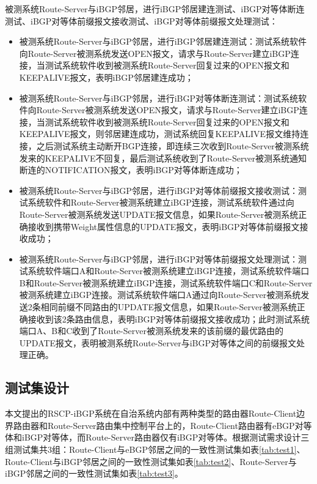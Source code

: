 被测系统Route-Server与iBGP邻居，进行iBGP邻居建连测试、iBGP对等体断连测试、iBGP对等体前缀报文接收测试、iBGP对等体前缀报文处理测试：
\begin{itemize}
  \item 被测系统Route-Server与iBGP邻居，进行iBGP邻居建连测试：测试系统软件向Route-Server被测系统发送OPEN报文，请求与Route-Server建立iBGP连接，当测试系统软件收到被测系统Route-Server回复过来的OPEN报文和KEEPALIVE报文，表明iBGP邻居建连成功；
  \item 被测系统Route-Server与iBGP邻居，进行iBGP对等体断连测试：测试系统软件向Route-Server被测系统发送OPEN报文，请求与Route-Server建立iBGP连接，当测试系统软件收到被测系统Route-Server回复过来的OPEN报文和KEEPALIVE报文，则邻居建连成功，测试系统回复KEEPALIVE报文维持连接，之后测试系统主动断开BGP连接，即连续三次收到Route-Server被测系统发来的KEEPALIVE不回复，最后测试系统收到了Route-Server被测系统通知断连的NOTIFICATION报文，表明iBGP对等体断连成功；
  \item 被测系统Route-Server与iBGP邻居，进行iBGP对等体前缀报文接收测试：测试系统软件和Route-Server被测系统建立iBGP连接，测试系统软件通过向Route-Server被测系统发送UPDATE报文信息，如果Route-Server被测系统正确接收到携带Weight属性信息的UPDATE报文，表明iBGP对等体前缀报文接收成功；
  \item 被测系统Route-Server与iBGP邻居，进行iBGP对等体前缀报文处理测试：测试系统软件端口A和Route-Server被测系统建立iBGP连接，测试系统软件端口B和Route-Server被测系统建立iBGP连接，测试系统软件端口C和Route-Server被测系统建立iBGP连接。测试系统软件端口A通过向Route-Server被测系统发送2条相同前缀不同路由的UPDATE报文信息，如果Route-Server被测系统正确接收到该2条路由信息，表明iBGP对等体前缀报文接收成功；此时测试系统端口A、B和C收到了Route-Server被测系统发来的该前缀的最优路由的UPDATE报文，表明被测系统Route-Server与iBGP对等体之间的前缀报文处理正确。
\end{itemize}



\subsection{测试集设计}

本文提出的RSCP-iBGP系统在自治系统内部有两种类型的路由器Route-Client边界路由器和Route-Server路由集中控制平台上的，Route-Client路由器有eBGP对等体和iBGP对等体，而Route-Server路由器仅有iBGP对等体。根据测试需求设计三组测试集共3组：Route-Client与eBGP邻居之间的一致性测试集如表\ref{tab:test1}、Route-Client与iBGP邻居之间的一致性测试集如表\ref{tab:test2}、Route-Server与iBGP邻居之间的一致性测试集如表\ref{tab:test3}。

